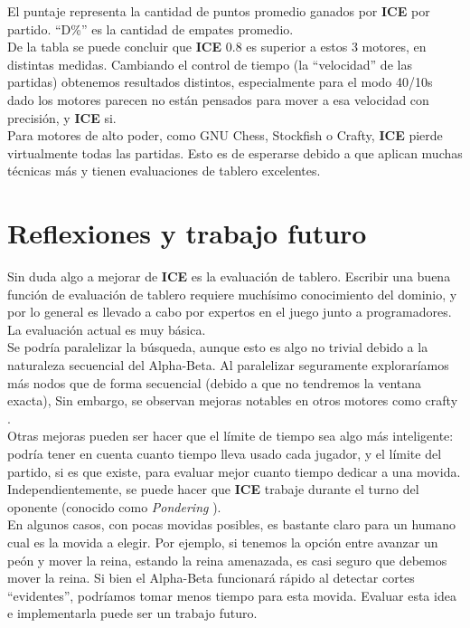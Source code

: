 \documentclass{article}
\newcommand{\ICE}[0]{{\bf ICE}}
\begin{document}
\begin{multicols}{2}
El puntaje representa la cantidad de puntos promedio ganados por \ICE{}
por partido. ``D\%'' es la cantidad de empates promedio.
\\

De la tabla se puede concluir que \ICE{} 0.8 es superior a estos
3 motores, en distintas medidas. Cambiando el control de tiempo
(la ``velocidad'' de las partidas) obtenemos resultados distintos,
especialmente para el modo 40/10s dado los motores parecen no están
pensados para mover a esa velocidad con precisión, y \ICE{} si.
\\

Para motores de alto poder, como GNU Chess, Stockfish o Crafty, \ICE{}
pierde virtualmente todas las partidas. Esto es de esperarse debido
a que aplican muchas técnicas más y tienen evaluaciones de tablero
excelentes.
\\

\section{Reflexiones y trabajo futuro}
Sin duda algo a mejorar de \ICE{} es la evaluación de tablero. Escribir
una buena función de evaluación de tablero requiere muchísimo
conocimiento del dominio, y por lo general es llevado a cabo por
expertos en el juego junto a programadores. La evaluación actual es muy
básica.
\\

Se podría paralelizar la búsqueda\cite{parallel-ab}, aunque esto
es algo no trivial debido a la naturaleza secuencial del Alpha-Beta.
Al paralelizar seguramente exploraríamos más nodos que de forma
secuencial (debido a que no tendremos la ventana exacta), Sin embargo,
se observan mejoras notables en otros motores como crafty \cite{crafty}
\cite{crafty-threads}.
\\

Otras mejoras pueden ser hacer que el límite de tiempo sea algo más
inteligente: podría tener en cuenta cuanto tiempo lleva usado cada
jugador, y el límite del partido, si es que existe, para evaluar
mejor cuanto tiempo dedicar a una movida. Independientemente, se puede
hacer que \ICE{} trabaje durante el turno del oponente (conocido como
\emph{Pondering}\cite{pondering} \cite{wiki:pondering}).
\\

En algunos casos, con pocas movidas posibles, es bastante claro para un
humano cual es la movida a elegir. Por ejemplo, si tenemos la opción
entre avanzar un peón y mover la reina, estando la reina amenazada,
es casi seguro que debemos mover la reina. Si bien el Alpha-Beta
funcionará rápido al detectar cortes ``evidentes'', podríamos tomar
menos tiempo para esta movida. Evaluar esta idea e implementarla puede
ser un trabajo futuro.
\\


\end{multicols}
\end{document}
